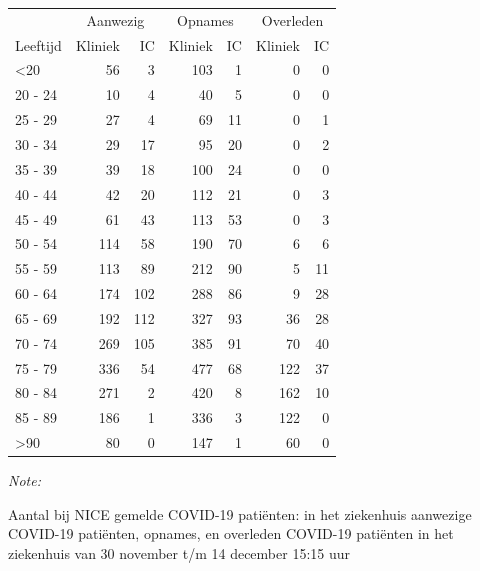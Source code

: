 \documentclass[
  english,
  man,floatsintext]{apa6}
\begin{document}
\begin{table}
\centering\begingroup\fontsize{10}{12}\selectfont

\begin{threeparttable}
\begin{tabular}{lrrrrrr}
\toprule
\multicolumn{1}{c}{ } & \multicolumn{2}{c}{Aanwezig} & \multicolumn{2}{c}{Opnames} & \multicolumn{2}{c}{Overleden} \\
\cmidrule(l{3pt}r{3pt}){2-3} \cmidrule(l{3pt}r{3pt}){4-5} \cmidrule(l{3pt}r{3pt}){6-7}
Leeftijd & Kliniek & IC & Kliniek & IC & Kliniek & IC\\
\midrule
<20 & 56 & 3 & 103 & 1 & 0 & 0\\
20 - 24 & 10 & 4 & 40 & 5 & 0 & 0\\
25 - 29 & 27 & 4 & 69 & 11 & 0 & 1\\
30 - 34 & 29 & 17 & 95 & 20 & 0 & 2\\
35 - 39 & 39 & 18 & 100 & 24 & 0 & 0\\
40 - 44 & 42 & 20 & 112 & 21 & 0 & 3\\
45 - 49 & 61 & 43 & 113 & 53 & 0 & 3\\
50 - 54 & 114 & 58 & 190 & 70 & 6 & 6\\
55 - 59 & 113 & 89 & 212 & 90 & 5 & 11\\
60 - 64 & 174 & 102 & 288 & 86 & 9 & 28\\
65 - 69 & 192 & 112 & 327 & 93 & 36 & 28\\
70 - 74 & 269 & 105 & 385 & 91 & 70 & 40\\
75 - 79 & 336 & 54 & 477 & 68 & 122 & 37\\
80 - 84 & 271 & 2 & 420 & 8 & 162 & 10\\
85 - 89 & 186 & 1 & 336 & 3 & 122 & 0\\
>90 & 80 & 0 & 147 & 1 & 60 & 0\\
\bottomrule
\end{tabular}
\begin{tablenotes}
\item \textit{Note: } 
\item Aantal bij NICE gemelde COVID-19 patiënten: in het ziekenhuis aanwezige COVID-19 patiënten, opnames, en overleden COVID-19 patiënten in het ziekenhuis van 30 november t/m 14 december 15:15 uur
\end{tablenotes}
\end{threeparttable}
\endgroup{}
\end{table}

\newpage
\end{document}
